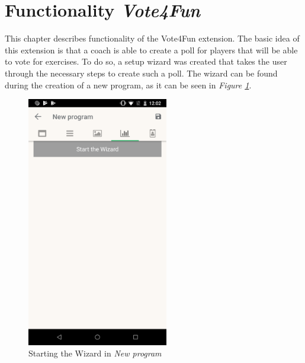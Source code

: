 \section{Functionality \textit{Vote4Fun}}
\label{sec:Vote4Fun}

This chapter describes functionality of the Vote4Fun extension. The basic idea of this extension is that a coach is able to create a poll for players that will be able to vote for exercises. To do so, a setup wizard was created that takes the user through the necessary steps to create such a poll. The wizard can be found during the creation of a new program, as it can be seen in \textit{Figure \ref{fig:select-wizard-screen}}.

\begin{figure}[ht!]
    \centering
    \includegraphics[width=0.55\textwidth,keepaspectratio]{content/pictures/screencap.png}
	\caption{Starting the Wizard in \textit{New program}}
	\label{fig:select-wizard-screen}
\end{figure}

